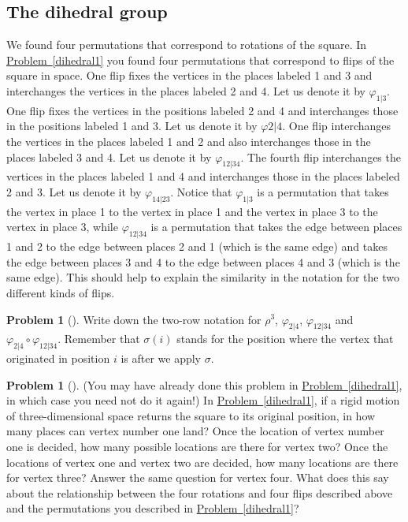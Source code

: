\documentclass[10pt,]{book}
\theoremstyle{plain}
\theoremstyle{definition}
\newtheorem{activity}[project]{Problem}
\theoremstyle{definition}
\numberwithin{equation}{chapter}
\begin{document}
\subsection[{The dihedral group}]{The dihedral group}\label{subsection-61}
\hypertarget{p-1503}{}%
We found four permutations that correspond to rotations of the square. In \hyperref[dihedral1]{Problem~\ref{dihedral1}} you found four permutations that correspond to flips of the square in space. One flip fixes the vertices in the places labeled 1 and 3 and interchanges the vertices in the places labeled 2 and 4. Let us denote it by \(\varphi_{1|3}\). One flip fixes the vertices in the positions labeled 2 and 4 and interchanges those in the positions labeled 1 and 3. Let us denote it by \(\varphi{2|4}\). One flip interchanges the vertices in the places labeled 1 and 2 and also interchanges those in the places labeled 3 and 4. Let us denote it by \(\varphi_{12|34}\). The fourth flip interchanges the vertices in the places labeled 1 and 4 and interchanges those in the places labeled 2 and 3. Let us denote it by \(\varphi_{14|23}\). Notice that \(\varphi_{1|3}\) is a permutation that takes the vertex in place 1 to the vertex in place 1 and the vertex in place 3 to the vertex in place 3, while \(\varphi_{12|34}\) is a permutation that takes the edge between places 1 and 2 to the edge between places 2 and 1 (which is the same edge) and takes the edge between places 3 and 4 to the edge between places 4 and 3 (which is the same edge). This should help to explain the similarity in the notation for the two different kinds of flips.%
\begin{activity}[] \label{dihedral2}
\hypertarget{p-1504}{}%
Write down the two-row notation for \(\rho^3\), \(\varphi_{2|4}\), \(\varphi_{12|34}\) and \(\varphi_{2|4}\circ \varphi_{12|34}\). Remember that \(\sigma(i)\) stands for the position where the vertex that originated in position \(i\) is after we apply \(\sigma\).%
\end{activity}
\begin{activity}[]\marginsymbol[-1em]{} \label{activity-260}
\hypertarget{p-1506}{}%
(You may have already done this problem in \hyperref[dihedral1]{Problem~\ref{dihedral1}}, in which case you need not do it again!) In \hyperref[dihedral1]{Problem~\ref{dihedral1}}, if a rigid motion of three-dimensional space returns the square to its original position, in how many places can vertex number one land? Once the location of vertex number one is decided, how many possible locations are there for vertex two? Once the locations of vertex one and vertex two are decided, how many locations are there for vertex three? Answer the same question for vertex four. What does this say about the relationship between the four rotations and four flips described above and the permutations you described in \hyperref[dihedral1]{Problem~\ref{dihedral1}}?%
\end{activity}
\end{document}
